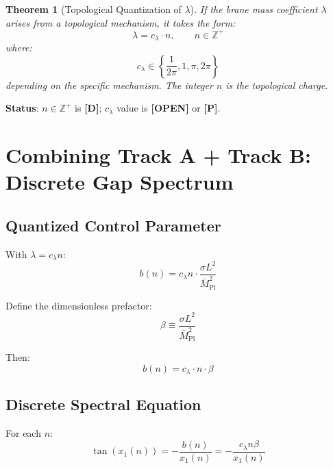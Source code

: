 \documentclass[11pt,a4paper]{article}
\newcommand{\Mpl}{\bar{M}_{\mathrm{Pl}}}
\newcommand{\tagD}{\textbf{[D]}}
\newcommand{\tagP}{\textbf{[P]}}
\newcommand{\tagOPEN}{\textbf{[OPEN]}}
\theoremstyle{definition}
\theoremstyle{plain}
\newtheorem{theorem}{Theorem}[section]
\theoremstyle{remark}
\begin{document}
\begin{theorem}[Topological Quantization of $\lambda$]
\label{thm:lambda-quant}
If the brane mass coefficient $\lambda$ arises from a topological mechanism,
it takes the form:
\begin{equation}
\boxed{\lambda = c_\lambda \cdot n, \qquad n \in \mathbb{Z}^+}
\label{eq:lambda-general}
\end{equation}
where:
\begin{equation}
c_\lambda \in \left\{ \frac{1}{2\pi}, 1, \pi, 2\pi \right\}
\label{eq:c-lambda-options}
\end{equation}
depending on the specific mechanism. The integer $n$ is the topological charge.
\end{theorem}

\textbf{Status}: $n \in \mathbb{Z}^+$ is \tagD{}; $c_\lambda$ value is \tagOPEN{} or \tagP{}.

\section{Combining Track A + Track B: Discrete Gap Spectrum}
\label{sec:combined}

\subsection{Quantized Control Parameter}

With $\lambda = c_\lambda n$:
\begin{equation}
b(n) = c_\lambda n \cdot \frac{\sigma L^2}{\Mpl^2}
\label{eq:b-n}
\end{equation}

Define the dimensionless prefactor:
\begin{equation}
\beta \equiv \frac{\sigma L^2}{\Mpl^2}
\label{eq:beta-def}
\end{equation}

Then:
\begin{equation}
b(n) = c_\lambda \cdot n \cdot \beta
\label{eq:b-n-beta}
\end{equation}

\subsection{Discrete Spectral Equation}

For each $n$:
\begin{equation}
\tan(x_1(n)) = -\frac{b(n)}{x_1(n)} = -\frac{c_\lambda n \beta}{x_1(n)}
\label{eq:spectral-n}
\end{equation}
\end{document}
